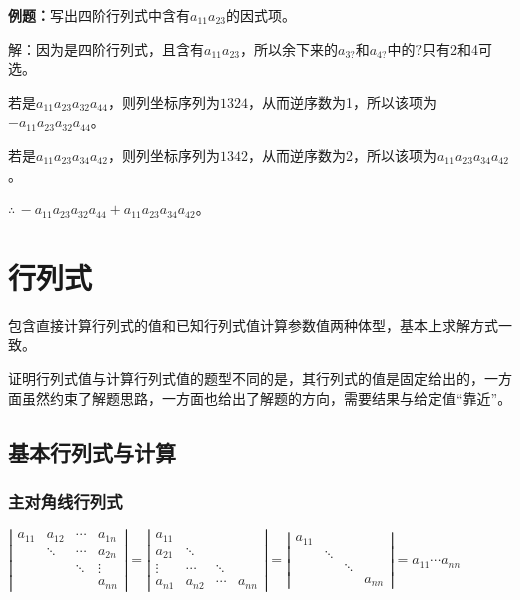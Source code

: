 \documentclass[UTF8, 12pt]{ctexart}
\begin{document}
\textbf{例题：}写出四阶行列式中含有$a_{11}a_{23}$的因式项。

解：因为是四阶行列式，且含有$a_{11}a_{23}$，所以余下来的$a_{3?}$和$a_{4?}$中的$?$只有2和4可选。

若是$a_{11}a_{23}a_{32}a_{44}$，则列坐标序列为$1324$，从而逆序数为1，所以该项为$-a_{11}a_{23}a_{32}a_{44}$。

若是$a_{11}a_{23}a_{34}a_{42}$，则列坐标序列为$1342$，从而逆序数为2，所以该项为$a_{11}a_{23}a_{34}a_{42}$。

$\therefore\,-a_{11}a_{23}a_{32}a_{44}+a_{11}a_{23}a_{34}a_{42}$。

\section{行列式}

包含直接计算行列式的值和已知行列式值计算参数值两种体型，基本上求解方式一致。

证明行列式值与计算行列式值的题型不同的是，其行列式的值是固定给出的，一方面虽然约束了解题思路，一方面也给出了解题的方向，需要结果与给定值“靠近”。

\subsection{基本行列式与计算}

\subsubsection{主对角线行列式}

$\left|\begin{array}{cccc} 
    a_{11} & a_{12} & \cdots & a_{1n} \\
     & \ddots & \cdots & a_{2n} \\
     & & \ddots & \vdots  \\
     & & & a_{nn}
\end{array}\right|=
\left|\begin{array}{cccc} 
    a_{11} & & & \\
    a_{21} & \ddots & & \\
    \vdots & \cdots & \ddots &  \\
    a_{n1} & a_{n2} & \cdots & a_{nn}
\end{array}\right|=
\left|\begin{array}{cccc} 
    a_{11} & & & \\
     & \ddots & & \\
     & & \ddots &  \\
     & & & a_{nn}
\end{array}\right|=a_{11}\cdots a_{nn}$
\end{document}
